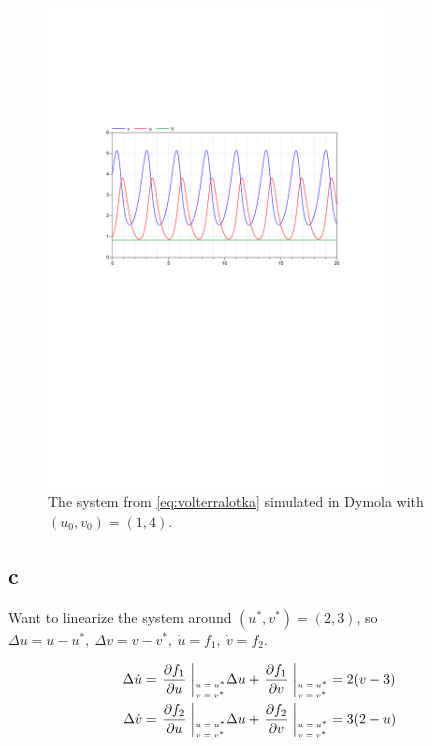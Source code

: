 \documentclass{article}
\begin{document}
\begin{figure}[H]
    \centering
    \includegraphics[width = 0.8\textwidth]{ex6_1b}
    \caption{The system from \ref{eq:volterralotka} simulated in Dymola with $(u_0,v_0) = (1,4)$.}
    \label{fig:1b}
\end{figure}



\subsection{c}

Want to linearize the system around $(u^*,v^*) = (2,3)$, so $\Delta u = u-u^*, \: \Delta v = v - v^*, \: \dot u = f_1, \: \dot v = f_2$.

\begin{align*}
    \Delta \dot u &= \left. \frac{\partial f_1}{\partial u} \right.\bigg|_{\shortstack{\tiny $u = u^*$ \\ \tiny $v = v^*$}} \Delta u + \left. \frac{\partial f_1}{\partial v} \right.\bigg|_{\shortstack{\tiny $u = u^*$ \\ \tiny $v = v^*$}} = 2(v-3)\\
    \Delta \dot v &= \left. \frac{\partial f_2}{\partial u} \right.\bigg|_{\shortstack{\tiny $u = u^*$ \\ \tiny $v = v^*$}} \Delta u + \left. \frac{\partial f_2}{\partial v} \right.\bigg|_{\shortstack{\tiny $u = u^*$ \\ \tiny $v = v^*$}} = 3(2-u) 
\end{align*}
\end{document}

